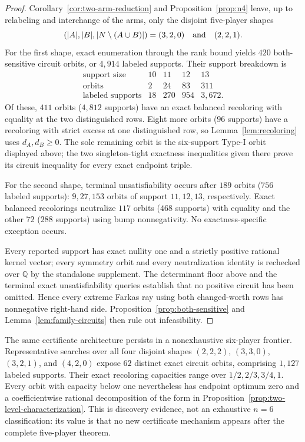 \documentclass[11pt]{article}
\begin{document}
\begin{proof}
Corollary~\ref{cor:two-arm-reduction} and Proposition~\ref{prop:n4} leave,
up to relabeling and interchange of the arms, only the disjoint five-player
shapes
\[
 (|A|,|B|,|N\setminus(A\cup B)|)=(3,2,0)\quad\hbox{and}\quad(2,2,1).
\]
For the first shape, exact enumeration through the rank bound yields $420$
both-sensitive circuit orbits, or $4{,}914$ labeled supports. Their support
breakdown is
\[
\begin{array}{c|rrrr}
\text{support size}&10&11&12&13\\ \hline
\text{orbits}&2&24&83&311\\
\text{labeled supports}&18&270&954&3{,}672.
\end{array}
\]
Of these, $411$ orbits ($4{,}812$ supports) have an exact balanced recoloring
with equality at the two distinguished rows. Eight more orbits ($96$
supports) have a recoloring with strict excess at one distinguished row, so
Lemma~\ref{lem:recoloring} uses $d_A,d_B\geq0$. The sole remaining orbit
is the six-support Type-I orbit displayed above; the two singleton-tight
exactness inequalities given there prove its circuit inequality for every
exact endpoint triple.

For the second shape, terminal unsatisfiability occurs after $189$ orbits
($756$ labeled supports): $9,27,153$ orbits of support $11,12,13$,
respectively. Exact balanced recolorings neutralize $117$ orbits
($468$ supports) with equality and the other $72$ ($288$ supports) using
bump nonnegativity. No exactness-specific exception occurs.

Every reported support has exact nullity one and a strictly positive rational
kernel vector; every symmetry orbit and every neutralization identity is
rechecked over $\mathbb Q$ by the standalone supplement. The determinant
floor above and the terminal exact unsatisfiability queries establish that no
positive circuit has been omitted. Hence every extreme Farkas ray using both
changed-worth rows has nonnegative right-hand side.
Proposition~\ref{prop:both-sensitive} and Lemma~\ref{lem:family-circuits}
then rule out infeasibility.
\end{proof}

The same certificate architecture persists in a nonexhaustive six-player
frontier. Representative searches over all four disjoint shapes
$(2,2,2)$, $(3,3,0)$, $(3,2,1)$, and $(4,2,0)$ expose $62$ distinct exact
circuit orbits, comprising $1{,}127$ labeled supports. Their exact
recoloring capacities range over $1/2,2/3,3/4,1$. Every orbit with capacity
below one nevertheless has endpoint optimum zero and a coefficientwise
rational decomposition of the form in
Proposition~\ref{prop:two-level-characterization}. This is discovery
evidence, not an exhaustive $n=6$ classification: its value is that no new
certificate mechanism appears after the complete five-player theorem.
\end{document}
